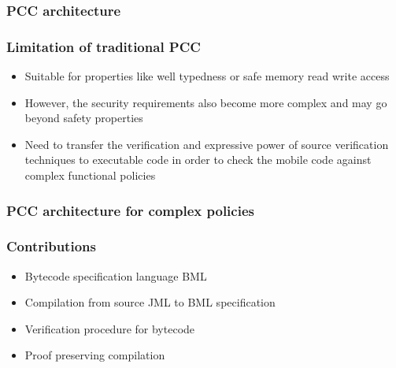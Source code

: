 \documentclass{beamer}
\begin{document}
\begin{frame}
\frametitle{PCC architecture}
\begin{center}
\end{center}
\end{frame}

\begin{frame}
\frametitle{Limitation of traditional PCC}
\begin{itemize}
 \item Suitable for properties like
       well typedness or safe memory read write access 
 \item However,%
       the security requirements also become more complex and 
       may go beyond safety properties 
            
  \item  Need to transfer the verification and expressive power of source verification techniques
        to executable code  in order to check the mobile code against complex functional policies 

\end{itemize}
\end{frame}


\begin{frame}\frametitle{PCC architecture for complex policies}
   \begin{center}
   \end{center}
\end{frame}


\begin{frame}\frametitle{Contributions}   
  \begin{itemize}
     \item Bytecode specification language BML
     \item Compilation from source JML to BML specification
     \item Verification procedure for bytecode 
     \item Proof preserving compilation
\end{itemize}
\end{frame} 






\end{document}
